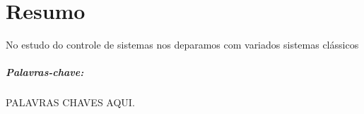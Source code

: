 \chapter*{Resumo}
\thispagestyle{empty}

No estudo do controle de sistemas nos deparamos com variados sistemas clássicos 

\vspace{50pt}

\paragraph{Palavras-chave:} PALAVRAS CHAVES AQUI.
